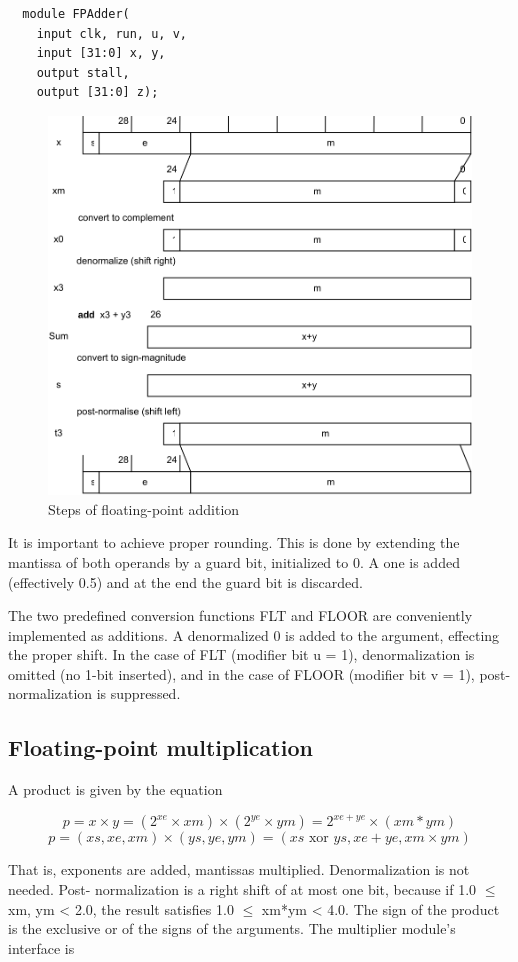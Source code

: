 \begin{verbatim}
  module FPAdder(
    input clk, run, u, v,
    input [31:0] x, y,
    output stall,
    output [31:0] z);
\end{verbatim}
\begin{figure}[h!]
	\centering
	\includegraphics[width=.9\textwidth]{i/F/7.png}
	\caption{Steps of floating-point addition}
	\label{fig:fpaddition}
\end{figure}

It is important to achieve proper rounding. This is done by extending the mantissa of both
operands by a guard bit, initialized to 0. A one is added (effectively 0.5) and at the end the guard
bit is discarded.

The two predefined conversion functions FLT and FLOOR are conveniently implemented as
additions. A denormalized 0 is added to the argument, effecting the proper shift. In the case of
FLT (modifier bit u = 1), denormalization is omitted (no 1-bit inserted), and in the case of FLOOR
(modifier bit v = 1), post-normalization is suppressed.

\subsection{Floating-point multiplication}
A product is given by the equation

\[ p = x × y = (2^{xe} × xm) × (2^{ye} × ym) = 2^{xe+ye} × (xm * ym) \]
\[ p = (xs, xe, xm) × (ys, ye, ym) = (xs\text{ xor }ys, xe + ye, xm × ym) \]

That is, exponents are added, mantissas multiplied. Denormalization is not needed. Post-
normalization is a right shift of at most one bit, because if 1.0 $\le$ xm, ym < 2.0, the result satisfies
1.0 $\le$ xm*ym < 4.0. The sign of the product is the exclusive or of the signs of the arguments. The
multiplier module's interface is

